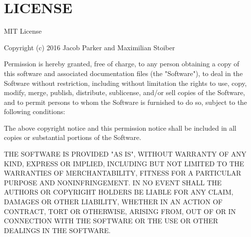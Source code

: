 \chapter{LICENSE}
\hypertarget{md_node__modules_2css-to-react-native_2_l_i_c_e_n_s_e}{}\label{md_node__modules_2css-to-react-native_2_l_i_c_e_n_s_e}
MIT License

Copyright (c) 2016 Jacob Parker and Maximilian Stoiber

Permission is hereby granted, free of charge, to any person obtaining a copy of this software and associated documentation files (the "{}\+Software"{}), to deal in the Software without restriction, including without limitation the rights to use, copy, modify, merge, publish, distribute, sublicense, and/or sell copies of the Software, and to permit persons to whom the Software is furnished to do so, subject to the following conditions\+:

The above copyright notice and this permission notice shall be included in all copies or substantial portions of the Software.

THE SOFTWARE IS PROVIDED "{}\+AS IS"{}, WITHOUT WARRANTY OF ANY KIND, EXPRESS OR IMPLIED, INCLUDING BUT NOT LIMITED TO THE WARRANTIES OF MERCHANTABILITY, FITNESS FOR A PARTICULAR PURPOSE AND NONINFRINGEMENT. IN NO EVENT SHALL THE AUTHORS OR COPYRIGHT HOLDERS BE LIABLE FOR ANY CLAIM, DAMAGES OR OTHER LIABILITY, WHETHER IN AN ACTION OF CONTRACT, TORT OR OTHERWISE, ARISING FROM, OUT OF OR IN CONNECTION WITH THE SOFTWARE OR THE USE OR OTHER DEALINGS IN THE SOFTWARE. 